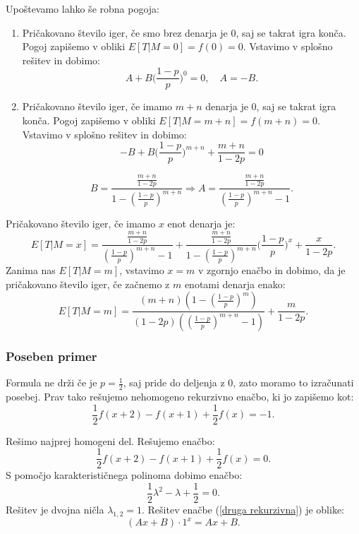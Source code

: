 \documentclass[12pt, a4paper]{article}
\begin{document}
Upoštevamo lahko še robna pogoja:
\begin{enumerate}
\item Pričakovano število iger, če smo brez denarja je 0, saj se takrat igra konča. Pogoj zapišemo v obliki $E[T|M= 0] = f(0) = 0$. Vstavimo v splošno rešitev in dobimo:
$$A + B\bigg( \frac{1-p}{p} \bigg )^0 = 0, \quad A = -B.$$
\item Pričakovano število iger, če imamo $m+n$ denarja je 0, saj se takrat igra konča. Pogoj zapišemo v obliki $E[T|M= m+n] = f(m+n) = 0$. Vstavimo v splošno rešitev in dobimo:
$$-B + B\bigg( \frac{1-p}{p} \bigg )^{m+n}+\frac{m+n}{1-2p}=0$$

$$B = \frac{\frac{m+n}{1-2p}}{1- \left(\frac{1-p}{p}\right)^{m+n}} \Rightarrow A = \frac{\frac{m+n}{1-2p}}{\left(\frac{1-p}{p}\right)^{m+n}-1}.$$
\end{enumerate}

Pričakovano število iger, če imamo $x$ enot denarja je: $$E[ T | M = x]= \frac{\frac{m+n}{1-2p}}{\left(\frac{1-p}{p}\right)^{m+n}-1} + \frac{\frac{m+n}{1-2p}}{1- \left(\frac{1-p}{p}\right)^{m+n}}\bigg( \frac{1-p}{p} \bigg )^x+\frac{x}{1-2p}.$$
 Zanima nas $E[T|M=m]$, vstavimo $x=m$ v zgornjo enačbo in dobimo, da je pričakovano število iger, če začnemo z $m$ enotami denarja enako: $$E[T|M=m]=\frac{(m+n) \left(1-\left(\frac{1-p}{p}\right)^m\right)}{(1-2 p)
   \left(\left(\frac{1-p}{p}\right)^{m+n}-1\right)}+\frac{m}{1-2 p}.$$

\subsubsection{Poseben primer}
\label{Posebni primer za 1/2}
Formula ne drži če je $p = \frac{1}{2}$, saj pride do deljenja z 0, zato moramo to izračunati posebej. Prav tako rešujemo nehomogeno rekurzivno enačbo, ki jo zapišemo kot: 
\begin{equation}
\label{druga rekurzivna}
\frac{1}{2}f(x+2)-f(x+1)+\frac{1}{2}f(x)=-1.
\end{equation}

Rešimo najprej homogeni del. Rešujemo enačbo: $$\frac{1}{2}f(x+2)-f(x+1)+\frac{1}{2}f(x)=0.$$ S pomočjo karakterističnega polinoma dobimo enačbo: 
\begin{equation}
\label{druga homogena}
\frac{1}{2}\lambda^2-\lambda+\frac{1}{2}=0.
\end{equation} 
Rešitev je dvojna ničla $\lambda_{1, 2}= 1$. Rešitev enačbe (\ref{druga rekurzivna}) je oblike: $$(Ax+B)\cdot 1^x=Ax+B.$$
\end{document}

